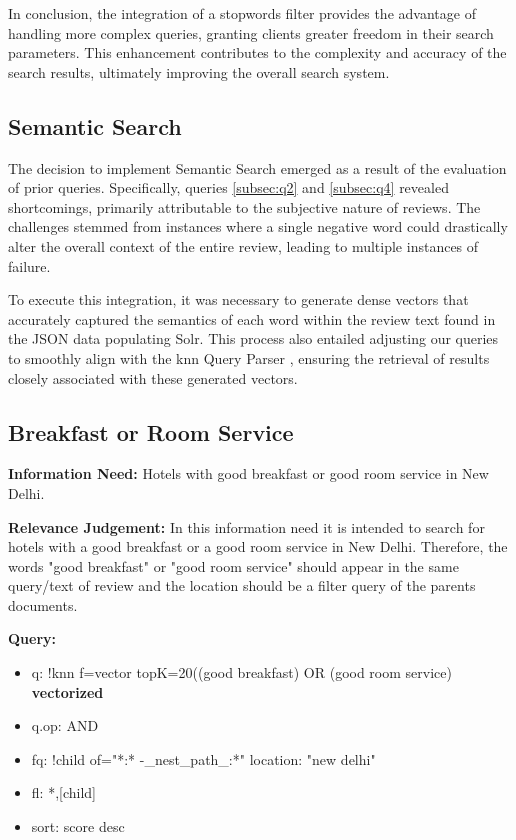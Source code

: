\documentclass[sigconf]{acmart}
\begin{document}
In conclusion, the integration of a stopwords filter provides the advantage of handling more complex queries, granting clients greater freedom in their search parameters. This enhancement contributes to the complexity and accuracy of the search results, ultimately improving the overall search system.


\renewcommand{\thesubsection}{\arabic{section}.2}
\subsection{Semantic Search}

The decision to implement Semantic Search emerged as a result of the evaluation of prior queries. Specifically, queries \ref{subsec:q2} and \ref{subsec:q4} revealed shortcomings, primarily attributable to the subjective nature of reviews. The challenges stemmed from instances where a single negative word could drastically alter the overall context of the entire review, leading to multiple instances of failure.

To execute this integration, it was necessary to generate dense vectors that accurately captured the semantics of each word within the review text found in the JSON data populating Solr. This process also entailed adjusting our queries to smoothly align with the knn Query Parser \cite{Dense_Vector_Search}, ensuring the retrieval of results closely associated with these generated vectors.

\renewcommand{\thesubsection}{\Alph{subsection}}

\setcounter{subsection}{0}
\subsection{Breakfast or Room Service}

\textbf{Information Need:} Hotels with good breakfast or good room service in New Delhi.

\textbf{Relevance Judgement:} In this information need it is intended to search for hotels with a good breakfast or a good room service in New Delhi. Therefore, the words "good breakfast" or "good room service" should appear in the same query/text of review and the location should be a filter query of the parents documents.

\textbf{Query:}

\begin{itemize}
    \item q: {!knn f=vector topK=20}((good breakfast) OR (good room service) \textbf{vectorized}
    \item q.op: AND
    \item fq: {!child of="*:* -\_nest\_path\_:*"} location: "new delhi"
    \item fl: *,[child]
    \item sort: score desc
\end{itemize}
\end{document}
